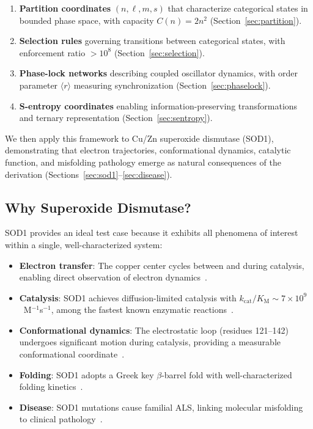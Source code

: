 \documentclass[twocolumn,aps,prx,superscriptaddress,longbibliography]{revtex4-2}
\theoremstyle{remark}
\newcommand{\kcat}{k_\text{cat}}
\newcommand{\Km}{K_\text{M}}
\newcommand{\orderpar}{\langle r \rangle}
\begin{document}
\begin{enumerate}
    \item \textbf{Partition coordinates} $(n, \ell, m, s)$ that characterize
    categorical states in bounded phase space, with capacity $C(n) = 2n^2$
    (Section~\ref{sec:partition}).

    \item \textbf{Selection rules} governing transitions between categorical
    states, with enforcement ratio $>10^8$ (Section~\ref{sec:selection}).

    \item \textbf{Phase-lock networks} describing coupled oscillator dynamics,
    with order parameter $\orderpar$ measuring synchronization
    (Section~\ref{sec:phaselock}).

    \item \textbf{S-entropy coordinates} enabling information-preserving
    transformations and ternary representation (Section~\ref{sec:sentropy}).
\end{enumerate}

We then apply this framework to Cu/Zn superoxide dismutase (SOD1),
demonstrating that electron trajectories, conformational dynamics, catalytic
function, and misfolding pathology emerge as natural consequences of the
derivation (Sections~\ref{sec:sod1}--\ref{sec:disease}).

\subsection{Why Superoxide Dismutase?}

SOD1 provides an ideal test case because it exhibits all phenomena of interest
within a single, well-characterized system:

\begin{itemize}
    \item \textbf{Electron transfer}: The copper center cycles between
     and  during catalysis, enabling direct observation
    of electron dynamics~\cite{Tainer1983}.

    \item \textbf{Catalysis}: SOD1 achieves diffusion-limited catalysis with
    $\kcat/\Km \sim 7 \times 10^9$~M$^{-1}$s$^{-1}$, among the fastest known
    enzymatic reactions~\cite{Klug1972}.

    \item \textbf{Conformational dynamics}: The electrostatic loop (residues
    121--142) undergoes significant motion during catalysis, providing a
    measurable conformational coordinate~\cite{Strange2003}.

    \item \textbf{Folding}: SOD1 adopts a Greek key $\beta$-barrel fold with
    well-characterized folding kinetics~\cite{Lindberg2002}.

    \item \textbf{Disease}: SOD1 mutations cause familial ALS, linking
    molecular misfolding to clinical pathology~\cite{Rosen1993}.
\end{itemize}
\end{document}
